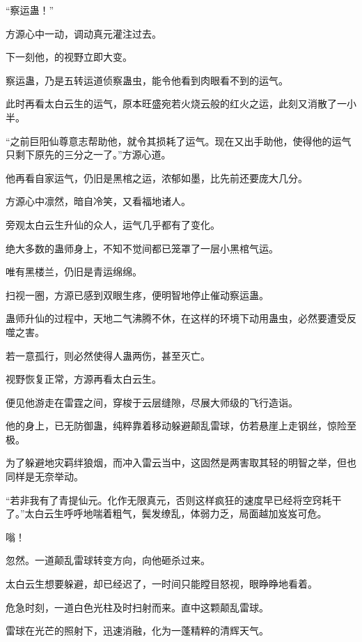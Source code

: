 
\begin{this_body}



“察运蛊！”

方源心中一动，调动真元灌注过去。

下一刻他，的视野立即大变。

察运蛊，乃是五转运道侦察蛊虫，能令他看到肉眼看不到的运气。

此时再看太白云生的运气，原本旺盛宛若火烧云般的红火之运，此刻又消散了一小半。

“之前巨阳仙尊意志帮助他，就令其损耗了运气。现在又出手助他，使得他的运气只剩下原先的三分之一了。”方源心道。

他再看自家运气，仍旧是黑棺之运，浓郁如墨，比先前还要庞大几分。

方源心中凛然，暗自冷笑，又看福地诸人。

旁观太白云生升仙的众人，运气几乎都有了变化。

绝大多数的蛊师身上，不知不觉间都已笼罩了一层小黑棺气运。

唯有黑楼兰，仍旧是青运绵绵。

扫视一圈，方源已感到双眼生疼，便明智地停止催动察运蛊。

蛊师升仙的过程中，天地二气沸腾不休，在这样的环境下动用蛊虫，必然要遭受反噬之害。

若一意孤行，则必然使得人蛊两伤，甚至灭亡。

视野恢复正常，方源再看太白云生。

便见他游走在雷霆之间，穿梭于云层缝隙，尽展大师级的飞行造诣。

他的身上，已无防御蛊，纯粹靠着移动躲避颠乱雷球，仿若悬崖上走钢丝，惊险至极。

为了躲避地灾羁绊狼烟，而冲入雷云当中，这固然是两害取其轻的明智之举，但也同样是无奈举动。

“若非我有了青提仙元。化作无限真元，否则这样疯狂的速度早已经将空窍耗干了。”太白云生呼呼地喘着粗气，鬓发缭乱，体弱力乏，局面越加岌岌可危。

嗡！

忽然。一道颠乱雷球转变方向，向他砸杀过来。

太白云生想要躲避，却已经迟了，一时间只能瞠目怒视，眼睁睁地看着。

危急时刻，一道白色光柱及时扫射而来。直中这颗颠乱雷球。

雷球在光芒的照射下，迅速消融，化为一蓬精粹的清辉天气。


\end{this_body}
